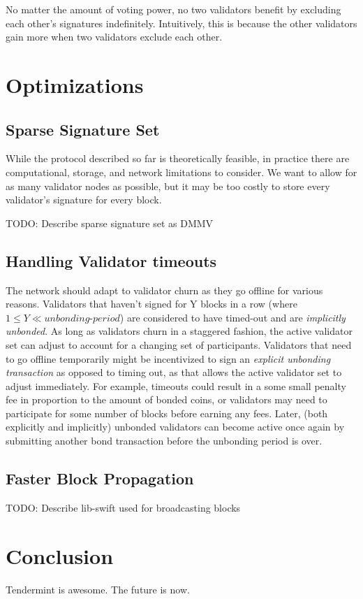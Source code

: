 \documentclass[letter,11pt]{article}
\begin{document}
No matter the amount of voting power, no two validators benefit by excluding each other’s signatures indefinitely. Intuitively, this is because the other validators gain more when two validators exclude each other.


\section{Optimizations} %

\subsection{Sparse Signature Set} %

While the protocol described so far is theoretically feasible, in practice there are computational, storage, and network limitations to consider. We want to allow for as many validator nodes as possible, but it may be too costly to store every validator’s signature for every block.

TODO: Describe sparse signature set as DMMV


\subsection{Handling Validator timeouts} %

The network should adapt to validator churn as they go offline for various reasons. Validators that haven't signed for Y blocks in a row (where $1 \le Y \ll \textit{unbonding-period}$) are considered to have timed-out and are \textit{implicitly unbonded}. As long as validators churn in a staggered fashion, the active validator set can adjust to account for a changing set of participants. Validators that need to go offline temporarily might be incentivized to sign an \textit{explicit unbonding transaction} as opposed to timing out, as that allows the active validator set to adjust immediately. For example, timeouts could result in a some small penalty fee in proportion to the amount of bonded coins, or validators may need to participate for some number of blocks before earning any fees. Later, (both explicitly and implicitly) unbonded validators can become active once again by submitting another bond transaction before the unbonding period is over.


\subsection{Faster Block Propagation} %

TODO: Describe lib-swift used for broadcasting blocks


\section{Conclusion} %

Tendermint is awesome. The future is now.


{}

\end{document}
